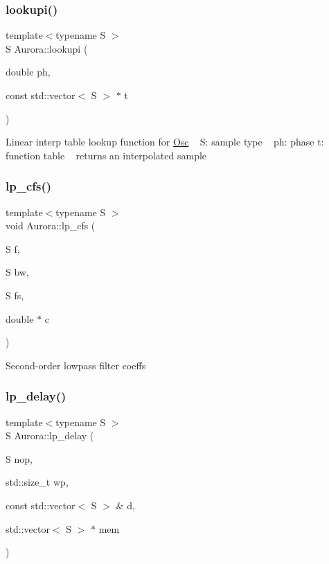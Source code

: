 \subsubsection{\texorpdfstring{lookupi()}{lookupi()}}
{\footnotesize\ttfamily template$<$typename S $>$ \\
S Aurora\+::lookupi (\begin{DoxyParamCaption}\item[{double}]{ph,  }\item[{const std\+::vector$<$ S $>$ $\ast$}]{t }\end{DoxyParamCaption})\hspace{0.3cm}{\ttfamily [inline]}}

Linear interp table lookup function for \hyperlink{class_aurora_1_1_osc}{Osc} ~\newline
S\+: sample type ~\newline
ph\+: phase  t\+: function table ~\newline
returns an interpolated sample \mbox{\label{namespace_aurora_af00fa05fba77610297abc0dcb14f2770}} 
\subsubsection{\texorpdfstring{lp\+\_\+cfs()}{lp\_cfs()}}
{\footnotesize\ttfamily template$<$typename S $>$ \\
void Aurora\+::lp\+\_\+cfs (\begin{DoxyParamCaption}\item[{S}]{f,  }\item[{S}]{bw,  }\item[{S}]{fs,  }\item[{double $\ast$}]{c }\end{DoxyParamCaption})\hspace{0.3cm}{\ttfamily [inline]}}

Second-\/order lowpass filter coeffs \mbox{\label{namespace_aurora_a3993d7b3f35ba929c5e59ba117252e1d}} 
\subsubsection{\texorpdfstring{lp\+\_\+delay()}{lp\_delay()}}
{\footnotesize\ttfamily template$<$typename S $>$ \\
S Aurora\+::lp\+\_\+delay (\begin{DoxyParamCaption}\item[{S}]{nop,  }\item[{std\+::size\+\_\+t}]{wp,  }\item[{const std\+::vector$<$ S $>$ \&}]{d,  }\item[{std\+::vector$<$ S $>$ $\ast$}]{mem }\end{DoxyParamCaption})\hspace{0.3cm}{\ttfamily [inline]}}

